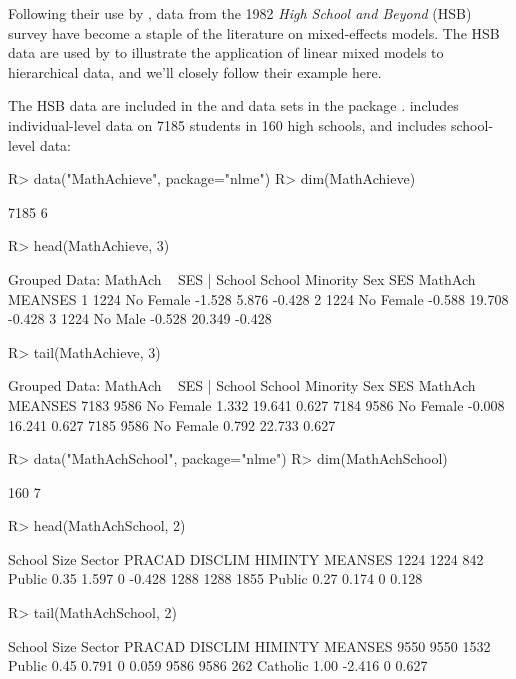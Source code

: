 \documentclass[
]{jss}
\begin{document}
Following their use by \citet{RaudenbushBryk:2002}, data from the 1982
\emph{High School and Beyond} (HSB) survey have become a staple of the
literature on mixed-effects models. The HSB data are used by \citet[Sec.
7.2.2]{FoxWeisberg:2019} to illustrate the application of linear mixed
models to hierarchical data, and we'll closely follow their example
here.

The HSB data are included in the  and
 data sets in the  package
\citep{PinheiroBates:2000}.  includes individual-level
data on 7185 students in 160 high schools, and 
includes school-level data:

\begin{CodeChunk}
\begin{CodeInput}
R> data("MathAchieve", package="nlme")
R> dim(MathAchieve)
\end{CodeInput}
\begin{CodeOutput}
[1] 7185    6
\end{CodeOutput}
\begin{CodeInput}
R> head(MathAchieve, 3)
\end{CodeInput}
\begin{CodeOutput}
Grouped Data: MathAch ~ SES | School
  School Minority    Sex    SES MathAch MEANSES
1   1224       No Female -1.528   5.876  -0.428
2   1224       No Female -0.588  19.708  -0.428
3   1224       No   Male -0.528  20.349  -0.428
\end{CodeOutput}
\begin{CodeInput}
R> tail(MathAchieve, 3)
\end{CodeInput}
\begin{CodeOutput}
Grouped Data: MathAch ~ SES | School
     School Minority    Sex    SES MathAch MEANSES
7183   9586       No Female  1.332  19.641   0.627
7184   9586       No Female -0.008  16.241   0.627
7185   9586       No Female  0.792  22.733   0.627
\end{CodeOutput}
\begin{CodeInput}
R> data("MathAchSchool", package="nlme")
R> dim(MathAchSchool)
\end{CodeInput}
\begin{CodeOutput}
[1] 160   7
\end{CodeOutput}
\begin{CodeInput}
R> head(MathAchSchool, 2)
\end{CodeInput}
\begin{CodeOutput}
     School Size Sector PRACAD DISCLIM HIMINTY MEANSES
1224   1224  842 Public   0.35   1.597       0  -0.428
1288   1288 1855 Public   0.27   0.174       0   0.128
\end{CodeOutput}
\begin{CodeInput}
R> tail(MathAchSchool, 2)
\end{CodeInput}
\begin{CodeOutput}
     School Size   Sector PRACAD DISCLIM HIMINTY MEANSES
9550   9550 1532   Public   0.45   0.791       0   0.059
9586   9586  262 Catholic   1.00  -2.416       0   0.627
\end{CodeOutput}
\end{CodeChunk}
\end{document}
